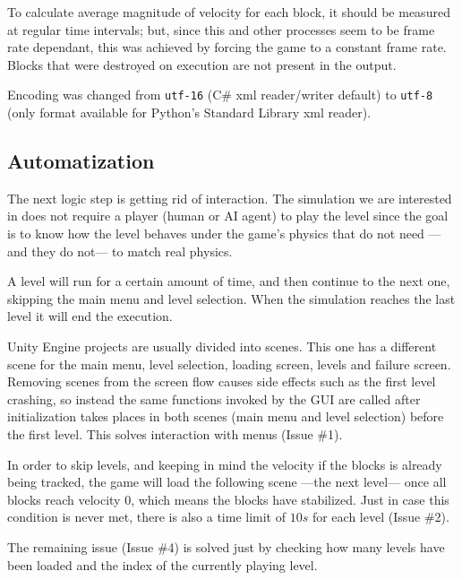 To calculate average magnitude of velocity for each block, it should be measured at regular time intervals; but, since this and other processes seem to be frame rate dependant, this was achieved by forcing the game to a constant frame rate. Blocks that were destroyed on execution are not present in the output.

Encoding was changed from \texttt{utf-16} (C\# xml reader/writer default) to \texttt{utf-8} (only format available for Python's Standard Library xml reader).

\subsection{Automatization}

The next logic step is getting rid of interaction. The simulation we are interested in does not require a player (human or AI agent) to play the level since the goal is to know how the level behaves under the game's physics that do not need ---and they do not--- to match real physics. 

A level will run for a certain amount of time, and then continue to the next one, skipping the main menu and level selection. When the simulation reaches the last level it will end the execution.

Unity Engine projects are usually divided into scenes. This one has a different scene for the main menu, level selection, loading screen, levels and failure screen. Removing scenes from the screen flow causes side effects such as the first level crashing, so instead the same functions invoked by the \acs{GUI} are called after initialization takes places in both scenes (main menu and level selection) before the first level. This solves interaction with menus (Issue \#1). 

In order to skip levels, and keeping in mind the velocity if the blocks is already being tracked, the game will load the following scene ---the next level--- once all blocks reach velocity $0$, which means the blocks have stabilized. Just in case this condition is never met, there is also a time limit of $10s$ for each level (Issue \#2). 

The remaining issue (Issue \#4) is solved just by checking how many levels have been loaded and the index of the currently playing level.


